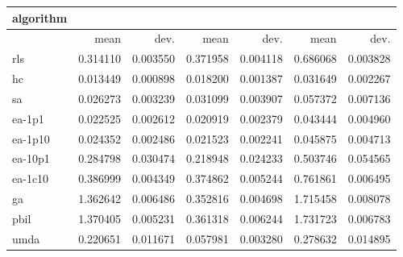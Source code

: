 \begin{tabular}{@{}l*{6}{>{{}}N{1}{2}}@{}}
\toprule
{algorithm} &  &  &  \\
\midrule
& {mean} & {dev.} & {mean} & {dev.} & {mean} & {dev.} \\
\midrule
rls & 0.314110 & 0.003550 & 0.371958 & 0.004118 & 0.686068 & 0.003828 \\
 hc & 0.013449 & 0.000898 & 0.018200 & 0.001387 & 0.031649 & 0.002267 \\
 sa & 0.026273 & 0.003239 & 0.031099 & 0.003907 & 0.057372 & 0.007136 \\
 ea-1p1 & 0.022525 & 0.002612 & 0.020919 & 0.002379 & 0.043444 & 0.004960 \\
 ea-1p10 & 0.024352 & 0.002486 & 0.021523 & 0.002241 & 0.045875 & 0.004713 \\
 ea-10p1 & 0.284798 & 0.030474 & 0.218948 & 0.024233 & 0.503746 & 0.054565 \\
 ea-1c10 & 0.386999 & 0.004349 & 0.374862 & 0.005244 & 0.761861 & 0.006495 \\
 ga & 1.362642 & 0.006486 & 0.352816 & 0.004698 & 1.715458 & 0.008078 \\
 pbil & 1.370405 & 0.005231 & 0.361318 & 0.006244 & 1.731723 & 0.006783 \\
 umda & 0.220651 & 0.011671 & 0.057981 & 0.003280 & 0.278632 & 0.014895 \\
 \bottomrule
\end{tabular}
